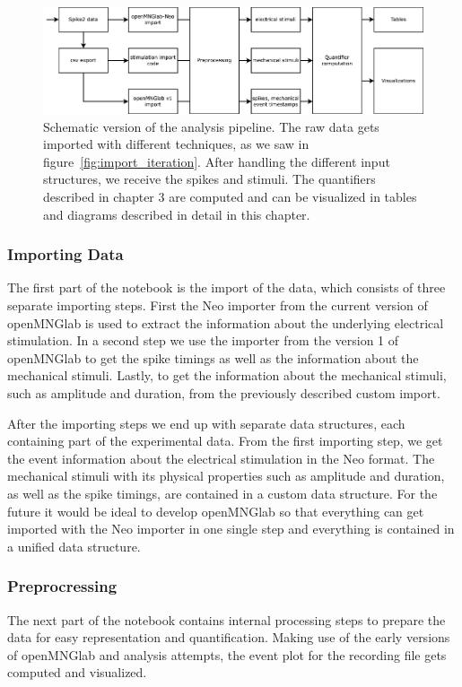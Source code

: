 \begin{figure}
	\includegraphics[width = \textwidth]{src/pic/analysis_notebook}
	\caption{Schematic version of the analysis pipeline. The raw data gets imported with different techniques, as we saw in figure~\ref{fig:import_iteration}. After handling the different input structures, we receive the spikes and stimuli. The quantifiers described in chapter 3 are computed and can be visualized in tables and diagrams described in detail in this chapter.}
	\label{fig:analysis_notebook}
\end{figure}
\subsubsection{Importing Data}
The first part of the notebook is the import of the data, which consists of three separate importing steps.
First the Neo importer from the current version of openMNGlab is used to extract the information about the underlying electrical stimulation. In a second step we use the importer from the version 1 of openMNGlab to get the spike timings as well as the information about the mechanical stimuli. Lastly, to get the information about the mechanical stimuli, such as amplitude and duration, from the previously described custom import.

After the importing steps we end up with separate data structures, each containing part of the experimental data. From the first importing step, we get the event information about the electrical stimulation in the Neo format. The mechanical stimuli with its physical properties such as amplitude and duration, as well as the spike timings, are contained in a custom data structure. For the future it would be ideal to develop openMNGlab so that everything can get imported with the Neo importer in one single step and everything is contained in a unified data structure.

\subsubsection{Preprocressing}
The next part of the notebook contains internal processing steps to prepare the data for easy representation and quantification. Making use of the early versions of openMNGlab and analysis attempts, the event plot for the recording file gets computed and visualized. 

